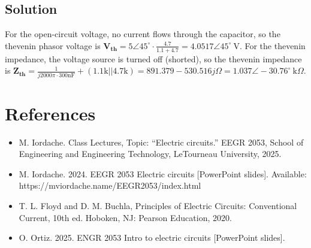 \documentclass{article}
\begin{document}
\subsection*{Solution}
For the open-circuit voltage, no current flows through the capacitor, so the thevenin phasor voltage is $\bm{V_{th}} = 5\angle45^\circ\cdot\frac{4.7}{1.1 + 4.7} = 4.0517 \angle45^\circ \ \textrm{V}$.
For the thevenin impedance, the voltage source is turned off (shorted), so the thevenin impedance is $\bm{Z_{th}} = \frac{1}{j2000\pi\cdot300\textrm{nF}} + (1.1\textrm{k} || 4.7\textrm{k}) = 891.379 - 530.516j \Omega = 1.037\angle-30.76^\circ \ \textrm{k}\Omega$.

\newpage
\section*{References}
\begin{itemize}
\item M. Iordache. Class Lectures, Topic: ``Electric circuits.'' EEGR 2053, School of Engineering and Engineering Technology, LeTourneau University, 2025.
\item M. Iordache. 2024. EEGR 2053 Electric circuits [PowerPoint slides]. Available: \\ https://mviordache.name/EEGR2053/index.html
\item T. L. Floyd and D. M. Buchla, Principles of Electric Circuits: Conventional Current, 10th ed. Hoboken, NJ: Pearson Education, 2020.
\item O. Ortiz. 2025. ENGR 2053 Intro to electric circuits [PowerPoint slides].
\end{itemize}
\end{document}
